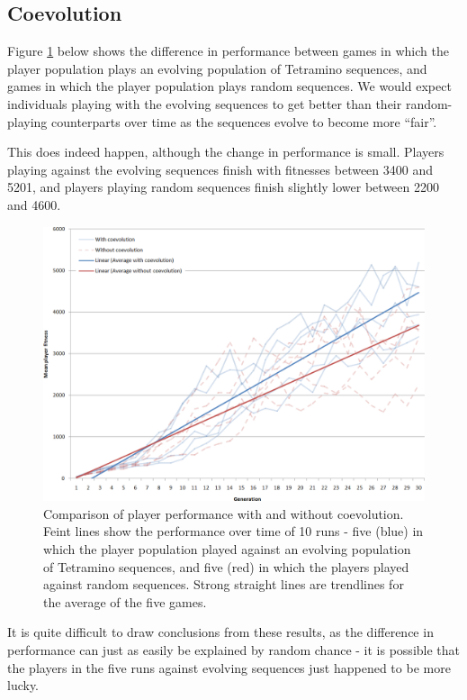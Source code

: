 \documentclass[a4paper,11pt]{article}
\begin{document}
\subsection{Coevolution}

Figure \ref{LinearCoev} below shows the difference in performance between games
in which the player population plays an evolving population of Tetramino
sequences, and games in which the player population plays random sequences.
We would expect individuals playing with the evolving sequences to get better
than their random-playing counterparts over time as the sequences evolve to
become more ``fair''.

This does indeed happen, although the change in performance is small.
Players playing against the evolving sequences finish with fitnesses between
3400 and 5201, and players playing random sequences finish slightly lower
between 2200 and 4600.

\clearpage

\begin{figure}[h]
  \label{LinearCoev}
  \centering
  \includegraphics[width=13cm]{results/linear-coev-vs-no-coev.png}
  \caption{Comparison of player performance with and without coevolution.
      Feint lines show the performance over time of 10 runs - five (blue) in which
      the player population played against an evolving population of Tetramino
      sequences, and five (red) in which the players played against random
      sequences.
      Strong straight lines are trendlines for the average of the five games.}
\end{figure}

It is quite difficult to draw conclusions from these results, as the difference
in performance can just as easily be explained by random chance - it is
possible that the players in the five runs against evolving sequences just
happened to be more lucky.
\end{document}
